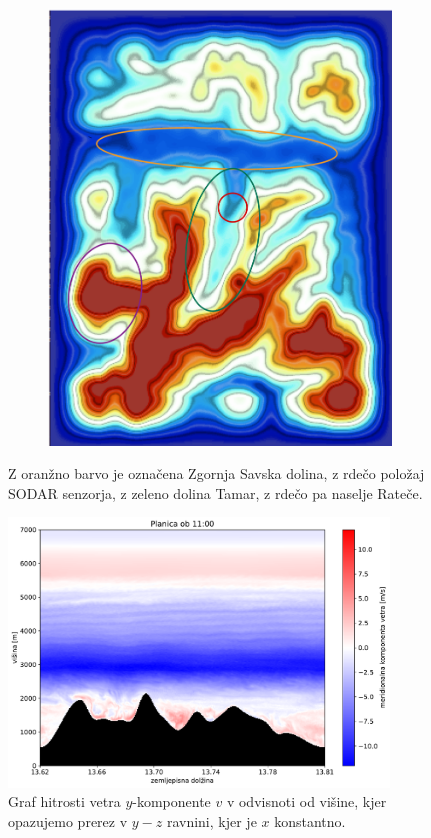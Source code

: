 \documentclass[mat2, tisk]{fmfdelo}
\begin{document}
\begin{figure}[h!]
\begin{subfigure}[b]{0.48\textwidth}
      \includegraphics[width=\textwidth]{rezultati/dem_planica2.jpeg}
      \label{fig:dem_planica2}
  \end{subfigure}
  \caption{Z oranžno barvo je označena Zgornja Savska dolina, z rdečo položaj SODAR senzorja, 
      z zeleno dolina Tamar, z rdečo pa naselje Rateče.}
  \label{fig:planica_combined}
\end{figure}


\begin{figure}[h!]
  \centering
  \includegraphics[width=0.9\textwidth]{rezultati/v_yz_5.pdf}
  \caption{Graf hitrosti vetra $y$-komponente $v$ v odvisnoti od višine, kjer opazujemo 
  prerez v $y-z$ ravnini, kjer je $x$ konstantno.}
\end{figure}
\end{document}
